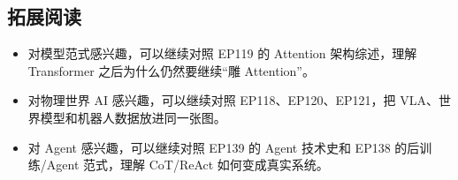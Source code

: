 \subsection{拓展阅读}

\begin{itemize}
\item 对模型范式感兴趣，可以继续对照 EP119 的 Attention 架构综述，理解 Transformer 之后为什么仍然要继续“雕 Attention”。
\item 对物理世界 AI 感兴趣，可以继续对照 EP118、EP120、EP121，把 VLA、世界模型和机器人数据放进同一张图。
\item 对 Agent 感兴趣，可以继续对照 EP139 的 Agent 技术史和 EP138 的后训练/Agent 范式，理解 CoT/ReAct 如何变成真实系统。
\end{itemize}



